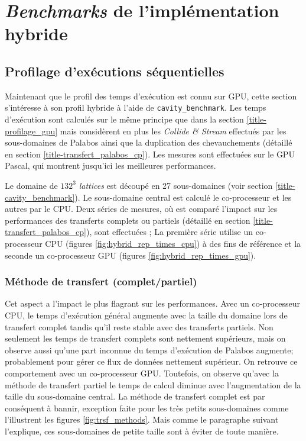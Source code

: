 \section{\textit{Benchmarks} de l'implémentation hybride}

\subsection{Profilage d'exécutions séquentielles}
Maintenant que le profil des temps d'exécution est connu sur \acs{GPU}, cette section s'intéresse à son profil hybride à l'aide de \texttt{cavity\_benchmark}. Les temps d'exécution sont calculés sur le même principe que dans la section \ref{title-profilage_gpu} mais considèrent en plus les \textit{Collide \& Stream} effectués par les sous-domaines de Palabos ainsi que la duplication des chevauchements (détaillé en section \ref{title-transfert_palabos_cp}). Les mesures sont effectuées sur le \acs{GPU} Pascal, qui montrent jusqu'ici les meilleures performances. 

Le domaine de $132^3$ \textit{lattices} est découpé en 27 sous-domaines (voir section \ref{title-cavity_benchmark}). Le sous-domaine central est calculé le co-processeur et les autres par le \acs{CPU}. Deux séries de mesures, où est comparé l'impact sur les performances des transferts complets ou partiels (détaillé en section \ref{title-transfert_palabos_cp}),  sont effectuées ; La première série utilise un co-processeur \acs{CPU} (figures \ref{fig:hybrid_rep_times_cpu}) à des fins de référence et la seconde un co-processeur \acs{GPU} (figures \ref{fig:hybrid_rep_times_gpu}).

\subsubsection{Méthode de transfert (complet/partiel)}
Cet  aspect a l'impact le plus flagrant sur les performances. Avec un co-processeur \acs{CPU}, le temps d'exécution général augmente avec la taille du domaine lors de transfert complet tandis qu'il reste stable avec des transferts partiels. Non seulement les temps de transfert complets sont nettement supérieurs, mais on observe aussi qu'une part inconnue du temps d'exécution de Palabos augmente; probablement pour gérer ce flux de données nettement supérieur. On retrouve ce comportement avec un co-processeur \acs{GPU}. Toutefois, on observe qu’avec la méthode de transfert partiel le temps de calcul diminue avec l’augmentation de la taille du sous-domaine central. La méthode de transfert complet est par conséquent à bannir, exception faite pour les très petits sous-domaines comme l'illustrent les figures \ref{fig:trsf_methods}. Mais comme le paragraphe suivant l’explique, ces sous-domaines de petite taille sont à éviter de toute manière.


